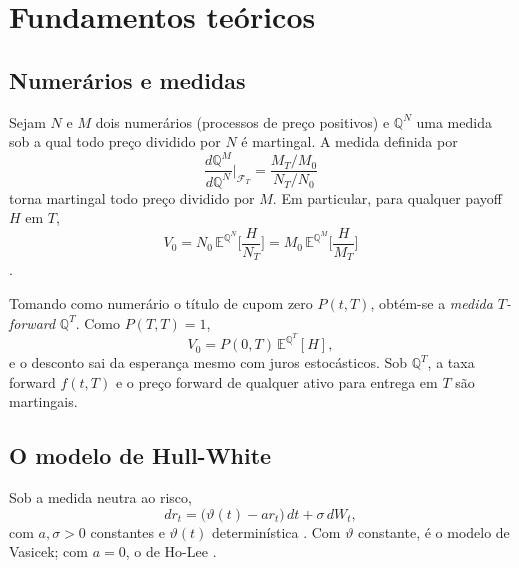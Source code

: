 \section{Fundamentos teóricos}

\subsection{Numerários e medidas}

\begin{teorema}\label{teo:numerario}
Sejam $N$ e $M$ dois numerários (processos de preço positivos) e $\mathbb Q^N$ uma medida sob a qual todo preço dividido por $N$ é martingal. A medida definida por
\begin{equation}
\frac{d\mathbb Q^M}{d\mathbb Q^N}\bigg|_{\mathcal F_T}=\frac{M_T/M_0}{N_T/N_0}
\end{equation}
torna martingal todo preço dividido por $M$. Em particular, para qualquer payoff $H$ em $T$,
\begin{equation}
V_0=N_0\,\mathbb E^{\mathbb Q^N}\Big[\frac{H}{N_T}\Big]=M_0\,\mathbb E^{\mathbb Q^M}\Big[\frac{H}{M_T}\Big]
\end{equation}
\citep{gemanetal1995}.
\end{teorema}

\begin{definicao}
Tomando como numerário o título de cupom zero $P(t,T)$, obtém-se a \emph{medida $T$-forward} $\mathbb Q^T$. Como $P(T,T)=1$,
\begin{equation}
V_0=P(0,T)\,\mathbb E^{\mathbb Q^T}[H],
\end{equation}
e o desconto sai da esperança mesmo com juros estocásticos. Sob $\mathbb Q^T$, a taxa forward $f(t,T)$ e o preço forward de qualquer ativo para entrega em $T$ são martingais.
\end{definicao}

\subsection{O modelo de Hull-White}

\begin{definicao}
Sob a medida neutra ao risco,
\begin{equation}\label{eq:hw}
dr_t=\big(\vartheta(t)-ar_t\big)\,dt+\sigma\,dW_t,
\end{equation}
com $a,\sigma>0$ constantes e $\vartheta(t)$ determinística \citep{hullwhite1990}. Com $\vartheta$ constante, é o modelo de Vasicek; com $a=0$, o de Ho-Lee \citep{vasicek1977,holee1986}.
\end{definicao}

